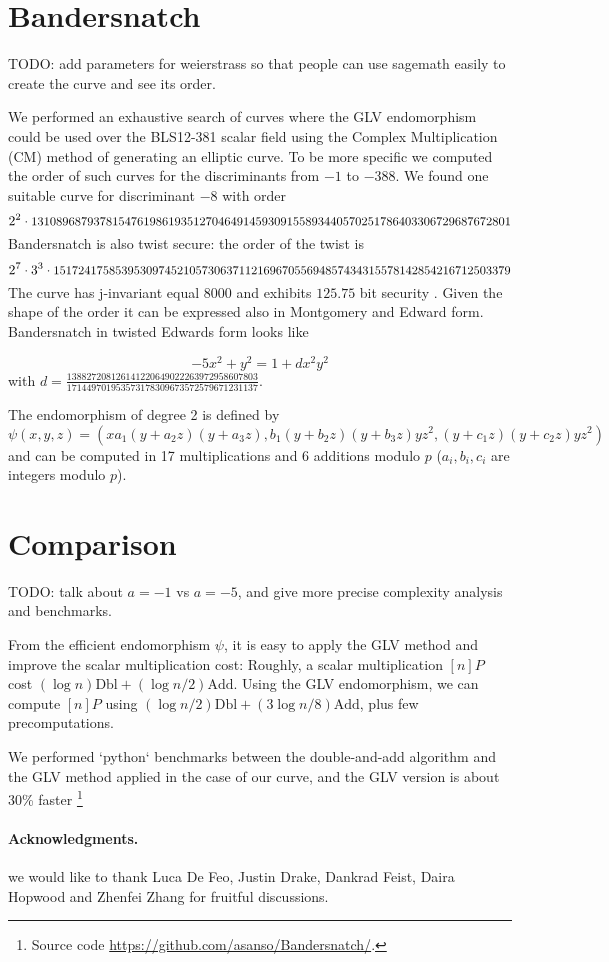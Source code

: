 \documentclass{amsart}
\newcommand{\SM}[1]{\color{blue}#1\color{black}}
\begin{document}
\section{Bandersnatch} 

\SM{TODO: add parameters for weierstrass so that people can use sagemath
easily to create the curve and see its order.}

We performed an exhaustive search of curves where the GLV endomorphism could be used over the BLS12-381 scalar field using the Complex Multiplication (CM) method of generating an elliptic curve. To be more specific we computed the order of such curves for the discriminants from $-1$ to $-388$.
We found one suitable curve for discriminant $-8$ with order 
$$2^2\cdot \text{\small{13108968793781547619861935127046491459309155893440570251786403306729687672801}}$$
Bandersnatch is also twist secure: the order of the twist is $$2^7 \cdot 3^3 \cdot \text{\small{15172417585395309745210573063711216967055694857434315578142854216712503379}}$$
The curve has j-invariant equal $8000$ and exhibits $125.75$ bit security  . Given the shape of the order it can be expressed also in Montgomery and Edward form. 
Bandersnatch in twisted Edwards form looks like

$$-5x^2+y^2 = 1+dx^2y^2$$ with
$d=\frac{138827208126141220649022263972958607803}{171449701953573178309673572579671231137}$.

\medskip
The endomorphism of degree 2 is defined by
$$\psi(x,y,z) = (xa_1(y+a_2z)(y+a_3z), b_1(y+b_2z)(y+b_3z)yz^2, (y+c_1z)(y+c_2z)yz^2)$$
and can be computed in 17 multiplications and 6 additions modulo $p$ ($a_i, b_i, c_i$ are integers modulo $p$).

\section{Comparison}

\SM{TODO: talk about $a=-1$ vs $a=-5$, and give more precise complexity
analysis and benchmarks.}

From the efficient endomorphism $\psi$, it is easy to apply the GLV method and improve the scalar multiplication cost:
Roughly, a scalar multiplication $[n]P$ cost $(\log n) \text{Dbl} + (\log n/2) \text{Add}$.
Using the GLV endomorphism, we can compute $[n]P$ using $(\log n/2 )\text{Dbl} + (3\log n/8) \text{Add}$, plus few precomputations.

We performed `python` benchmarks between the double-and-add algorithm and the GLV method applied in the case of our curve, and the GLV version is about 30\% faster 
\footnote{Source code \url{https://github.com/asanso/Bandersnatch/}.}

\bigskip
\paragraph*{\textbf{Acknowledgments.}} we would like to thank Luca De Feo, Justin Drake, Dankrad Feist, Daira Hopwood and Zhenfei Zhang for fruitful discussions.

{}

\end{document}
